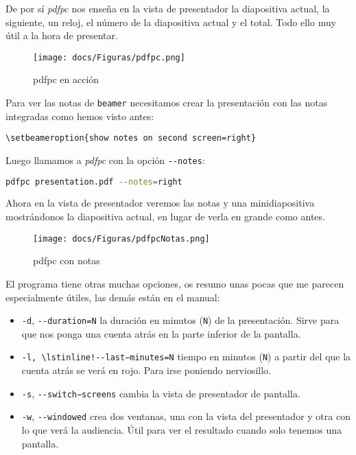 De por sí \emph{pdfpc} nos enseña en la vista de presentador la
diapositiva actual, la siguiente, un reloj, el número de la diapositiva
actual y el total. Todo ello muy útil a la hora de presentar.

\begin{figure}[htbp]
\centering
\texttt{[image: docs/Figuras/pdfpc.png]}
\caption{pdfpc en acción}
\end{figure}

Para ver las notas de \lstinline!beamer! necesitamos crear la
presentación con las notas integradas como hemos visto antes:

\begin{lstlisting}
\setbeameroption{show notes on second screen=right}
\end{lstlisting}

Luego llamamos a \emph{pdfpc} con la opción \lstinline!--notes!:

\begin{lstlisting}[language=bash]
pdfpc presentation.pdf --notes=right
\end{lstlisting}

Ahora en la vista de presentador veremos las notas y una minidiapositiva
mostrándonos la diapositiva actual, en lugar de verla en grande como
antes.

\begin{figure}[htbp]
\centering
\texttt{[image: docs/Figuras/pdfpcNotas.png]}
\caption{pdfpc con notas}
\end{figure}

El programa tiene otras muchas opciones, os resumo unas pocas que me
parecen especialmente útiles, las demás están en el manual:

\begin{itemize}
\item
  \lstinline!-d!, \lstinline!--duration=N! la duración en minutos
  (\lstinline!N!) de la presentación. Sirve para que nos ponga una
  cuenta atrás en la parte inferior de la pantalla.
\item
  \lstinline$-l, \lstinline!--last−minutes=N$ tiempo en minutos
  (\lstinline!N!) a partir del que la cuenta atrás se verá en rojo. Para
  irse poniendo nerviosillo.
\item
  \lstinline!-s!, \lstinline$--switch−screens$ cambia la vista de
  presentador de pantalla.
\item
  \lstinline!-w!, \lstinline!--windowed! crea dos ventanas, una con la
  vista del presentador y otra con lo que verá la audiencia. Útil para
  ver el resultado cuando solo tenemos una pantalla.
\end{itemize}

